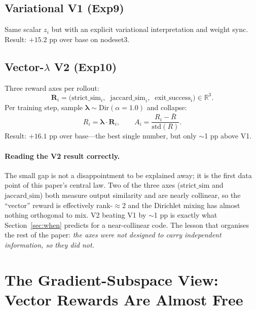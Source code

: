 \documentclass[11pt,a4paper]{article}
\newcommand{\R}{\mathbb{R}}
\begin{document}
\subsection{Variational V1 (Exp9)}

Same scalar $z_i$ but with an explicit variational interpretation and
weight sync.  Result: $+15.2$ pp over base on nodeset3.

\subsection{Vector-$\lambda$ V2 (Exp10)}

Three reward axes per rollout:
\begin{equation}
  \bm{R}_i = \big(\mathrm{strict\_sim}_i,\;\;
                \mathrm{jaccard\_sim}_i,\;\;
                \mathrm{exit\_success}_i\big) \in \R^3.
  \label{eq:v2-reward}
\end{equation}
Per training step, sample $\bm{\lambda} \sim \mathrm{Dir}(\alpha{=}1.0)$
and collapse:
\begin{equation}
  R_i = \bm{\lambda} \cdot \bm{R}_i, \qquad
  A_i = \frac{R_i - \bar{R}}{\mathrm{std}(R)}.
  \label{eq:v2-dirichlet}
\end{equation}
Result: $+16.1$ pp over base---the best single number, but only $\sim$1 pp
above V1.

\paragraph{Reading the V2 result correctly.}
The small gap is not a disappointment to be explained away; it is the first
data point of this paper's central law.  Two of the three axes
($\mathrm{strict\_sim}$ and $\mathrm{jaccard\_sim}$) both measure output
similarity and are nearly collinear, so the ``vector'' reward is effectively
rank-$\approx$2 and the Dirichlet mixing has almost nothing orthogonal to
mix.  V2 beating V1 by $\sim$1 pp is exactly what
Section~\ref{sec:when} predicts for a near-collinear code.  The lesson that
organises the rest of the paper: \emph{the axes were not designed to carry
independent information, so they did not.}

\section{The Gradient-Subspace View: Vector Rewards Are Almost Free}
\label{sec:subspace}
\end{document}
